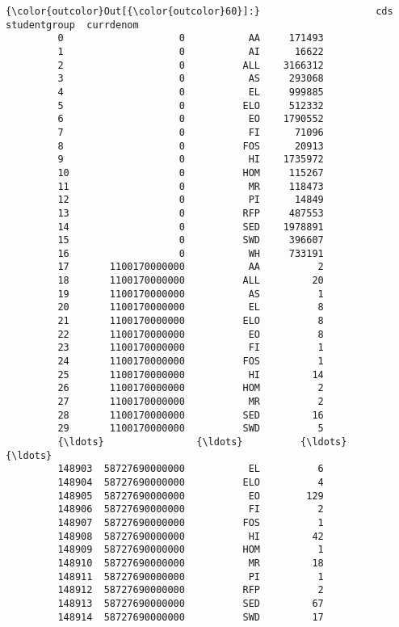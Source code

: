 \documentclass[11pt]{article}
\begin{document}
\begin{Verbatim}[commandchars=\\\{\}]
{\color{outcolor}Out[{\color{outcolor}60}]:}                    cds studentgroup  currdenom
         0                    0           AA     171493
         1                    0           AI      16622
         2                    0          ALL    3166312
         3                    0           AS     293068
         4                    0           EL     999885
         5                    0          ELO     512332
         6                    0           EO    1790552
         7                    0           FI      71096
         8                    0          FOS      20913
         9                    0           HI    1735972
         10                   0          HOM     115267
         11                   0           MR     118473
         12                   0           PI      14849
         13                   0          RFP     487553
         14                   0          SED    1978891
         15                   0          SWD     396607
         16                   0           WH     733191
         17       1100170000000           AA          2
         18       1100170000000          ALL         20
         19       1100170000000           AS          1
         20       1100170000000           EL          8
         21       1100170000000          ELO          8
         22       1100170000000           EO          8
         23       1100170000000           FI          1
         24       1100170000000          FOS          1
         25       1100170000000           HI         14
         26       1100170000000          HOM          2
         27       1100170000000           MR          2
         28       1100170000000          SED         16
         29       1100170000000          SWD          5
         {\ldots}                {\ldots}          {\ldots}        {\ldots}
         148903  58727690000000           EL          6
         148904  58727690000000          ELO          4
         148905  58727690000000           EO        129
         148906  58727690000000           FI          2
         148907  58727690000000          FOS          1
         148908  58727690000000           HI         42
         148909  58727690000000          HOM          1
         148910  58727690000000           MR         18
         148911  58727690000000           PI          1
         148912  58727690000000          RFP          2
         148913  58727690000000          SED         67
         148914  58727690000000          SWD         17

\end{Verbatim}
\end{document}

